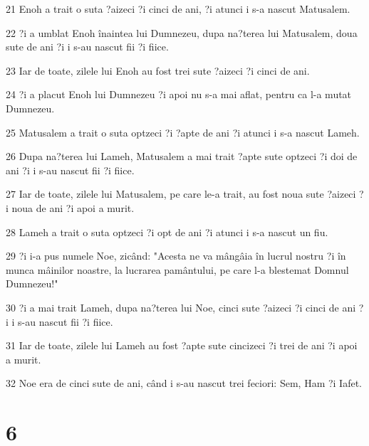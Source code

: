 \par 21 Enoh a trait o suta ?aizeci ?i cinci de ani, ?i atunci i s-a nascut Matusalem.
\par 22 ?i a umblat Enoh înaintea lui Dumnezeu, dupa na?terea lui Matusalem, doua sute de ani ?i i s-au nascut fii ?i fiice.
\par 23 Iar de toate, zilele lui Enoh au fost trei sute ?aizeci ?i cinci de ani.
\par 24 ?i a placut Enoh lui Dumnezeu ?i apoi nu s-a mai aflat, pentru ca l-a mutat Dumnezeu.
\par 25 Matusalem a trait o suta optzeci ?i ?apte de ani ?i atunci i s-a nascut Lameh.
\par 26 Dupa na?terea lui Lameh, Matusalem a mai trait ?apte sute optzeci ?i doi de ani ?i i s-au nascut fii ?i fiice.
\par 27 Iar de toate, zilele lui Matusalem, pe care le-a trait, au fost noua sute ?aizeci ?i noua de ani ?i apoi a murit.
\par 28 Lameh a trait o suta optzeci ?i opt de ani ?i atunci i s-a nascut un fiu.
\par 29 ?i i-a pus numele Noe, zicând: "Acesta ne va mângâia în lucrul nostru ?i în munca mâinilor noastre, la lucrarea pamântului, pe care l-a blestemat Domnul Dumnezeu!"
\par 30 ?i a mai trait Lameh, dupa na?terea lui Noe, cinci sute ?aizeci ?i cinci de ani ?i i s-au nascut fii ?i fiice.
\par 31 Iar de toate, zilele lui Lameh au fost ?apte sute cincizeci ?i trei de ani ?i apoi a murit.
\par 32 Noe era de cinci sute de ani, când i s-au nascut trei feciori: Sem, Ham ?i Iafet.

\chapter{6}

